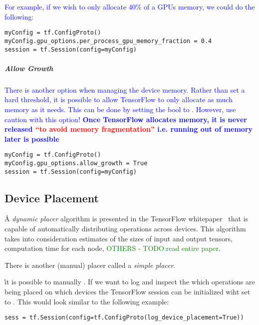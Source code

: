 \textcolor{blue}{For example, if we wish to only allocate 40\% of a GPUs memory, we could do the following:}

\begin{lstlisting}[style=pyInStyle]
myConfig = tf.ConfigProto()
myConfig.gpu_options.per_process_gpu_memory_fraction = 0.4
session = tf.Session(config=myConfig)
\end{lstlisting}


\subparagraph{Allow Growth}

\textcolor{blue}{There is another option when managing the device memory. Rather than set a hard threshold, it is possible to allow TensorFlow to only allocate as much memory as it needs. This can be done by setting the  bool to . However, use caution with this option! \textbf{Once TensorFlow allocates memory, it is never released \textcolor{red}{``to avoid memory fragmentation''} i.e. running out of memory later is possible}}

\begin{lstlisting}[style=pyInStyle]
myConfig = tf.ConfigProto()
myConfig.gpu_options.allow_growth = True
session = tf.Session(config=myConfig)
\end{lstlisting}


\subsection{Device Placement}

\r{A \textit{dynamic placer} algorithm is presented in the {TensorFlow whitepaper}~\cite{abadi2016tensorflow_device_placement} that is capable of automatically distributing operations across devices. This algorithm takes into consideration  estimates of the sizes of input and output tensors, computation time for each node, \textcolor{green}{OTHERS - TODO:read entire paper}.}

\r{There is another (manual) placer called a \textit{simple placer}.}


\r{it is possible to manually  . If we want to log and inspect the which operations are being placed on which devices the TensorFlow session can be initialized wiht  set to . This would look similar to the following example: }

\begin{lstlisting}[style=pyInStyle]
sess = tf.Session(config=tf.ConfigProto(log_device_placement=True))
\end{lstlisting}

